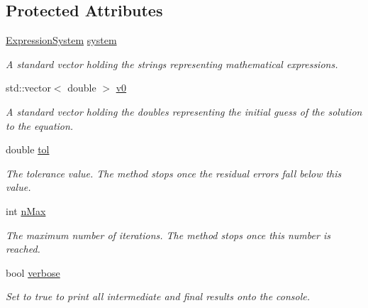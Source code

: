 \subsection*{Protected Attributes}
\begin{DoxyCompactItemize}
\item 
\hyperlink{class_expression_system}{Expression\+System} \hyperlink{class_nonlinear_systems_solver_ad58bb6449941acd3f88bc5647b4c8068}{system}\hypertarget{class_nonlinear_systems_solver_ad58bb6449941acd3f88bc5647b4c8068}{}\label{class_nonlinear_systems_solver_ad58bb6449941acd3f88bc5647b4c8068}

\begin{DoxyCompactList}\small\item\em A standard vector holding the strings representing mathematical expressions. \end{DoxyCompactList}\item 
std\+::vector$<$ double $>$ \hyperlink{class_nonlinear_systems_solver_a9733d9d1f170044dbefe980945070ba3}{v0}\hypertarget{class_nonlinear_systems_solver_a9733d9d1f170044dbefe980945070ba3}{}\label{class_nonlinear_systems_solver_a9733d9d1f170044dbefe980945070ba3}

\begin{DoxyCompactList}\small\item\em A standard vector holding the doubles representing the initial guess of the solution to the equation. \end{DoxyCompactList}\item 
double \hyperlink{class_nonlinear_systems_solver_a526132d9a95f69bd0e84682f61b5e732}{tol}\hypertarget{class_nonlinear_systems_solver_a526132d9a95f69bd0e84682f61b5e732}{}\label{class_nonlinear_systems_solver_a526132d9a95f69bd0e84682f61b5e732}

\begin{DoxyCompactList}\small\item\em The tolerance value. The method stops once the residual errors fall below this value. \end{DoxyCompactList}\item 
int \hyperlink{class_nonlinear_systems_solver_aa0075f162a80bd76fb2b05947f880eb3}{n\+Max}\hypertarget{class_nonlinear_systems_solver_aa0075f162a80bd76fb2b05947f880eb3}{}\label{class_nonlinear_systems_solver_aa0075f162a80bd76fb2b05947f880eb3}

\begin{DoxyCompactList}\small\item\em The maximum number of iterations. The method stops once this number is reached. \end{DoxyCompactList}\item 
bool \hyperlink{class_nonlinear_systems_solver_a3080b2ab66741d474b5a9a4f2244b5a7}{verbose}\hypertarget{class_nonlinear_systems_solver_a3080b2ab66741d474b5a9a4f2244b5a7}{}\label{class_nonlinear_systems_solver_a3080b2ab66741d474b5a9a4f2244b5a7}

\begin{DoxyCompactList}\small\item\em Set to true to print all intermediate and final results onto the console. \end{DoxyCompactList}\end{DoxyCompactItemize}
